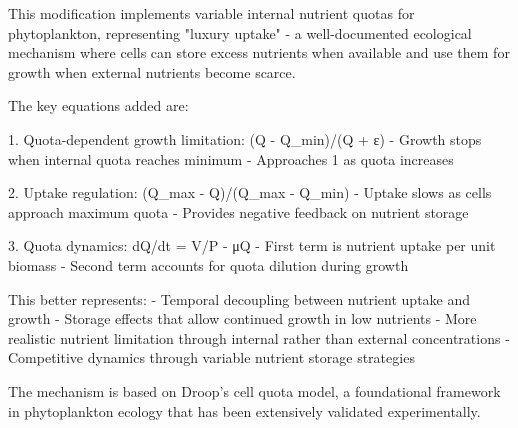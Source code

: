 This modification implements variable internal nutrient quotas for phytoplankton, representing "luxury uptake" - a well-documented ecological mechanism where cells can store excess nutrients when available and use them for growth when external nutrients become scarce.

The key equations added are:

1. Quota-dependent growth limitation: (Q - Q_min)/(Q + ε)
   - Growth stops when internal quota reaches minimum
   - Approaches 1 as quota increases
   
2. Uptake regulation: (Q_max - Q)/(Q_max - Q_min)
   - Uptake slows as cells approach maximum quota
   - Provides negative feedback on nutrient storage

3. Quota dynamics: dQ/dt = V/P - μQ
   - First term is nutrient uptake per unit biomass
   - Second term accounts for quota dilution during growth

This better represents:
- Temporal decoupling between nutrient uptake and growth
- Storage effects that allow continued growth in low nutrients
- More realistic nutrient limitation through internal rather than external concentrations
- Competitive dynamics through variable nutrient storage strategies

The mechanism is based on Droop's cell quota model, a foundational framework in phytoplankton ecology that has been extensively validated experimentally.
